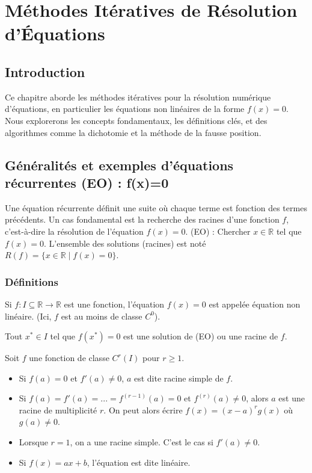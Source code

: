 \documentclass{article}
\begin{document}
\sloppy

\section{Méthodes Itératives de Résolution d'Équations} %
\subsection{Introduction} %
Ce chapitre aborde les méthodes itératives pour la résolution numérique d'équations, en particulier les équations non linéaires de la forme $f(x)=0$. Nous explorerons les concepts fondamentaux, les définitions clés, et des algorithmes comme la dichotomie et la méthode de la fausse position.

\subsection{Généralités et exemples d'équations récurrentes (EO) : f(x)=0} %
Une équation récurrente définit une suite où chaque terme est fonction des termes précédents. Un cas fondamental est la recherche des racines d'une fonction $f$, c'est-à-dire la résolution de l'équation $f(x)=0$.
(EO) : Chercher $x \in \mathbb{R}$ tel que $f(x)=0$.
L'ensemble des solutions (racines) est noté $R(f) = \{x \in \mathbb{R} \mid f(x)=0\}$.

\subsubsection{Définitions} %
\begin{definition}
Si $f: I \subseteq \mathbb{R} \to \mathbb{R}$ est une fonction, l'équation $f(x)=0$ est appelée équation non linéaire. (Ici, $f$ est au moins de classe $C^0$).
\end{definition}

\begin{definition}[Solution]
Tout $x^* \in I$ tel que $f(x^*)=0$ est une solution de (EO) ou une racine de $f$.
\end{definition}

\begin{definition}
Soit $f$ une fonction de classe $C^r(I)$ pour $r \ge 1$.
\begin{itemize}
    \item Si $f(a)=0$ et $f'(a) \ne 0$, $a$ est dite racine simple de $f$.
    \item Si $f(a)=f'(a)=...=f^{(r-1)}(a)=0$ et $f^{(r)}(a) \ne 0$, alors $a$ est une racine de multiplicité $r$. On peut alors écrire $f(x) = (x-a)^r g(x)$ où $g(a) \ne 0$.
    \item Lorsque $r=1$, on a une racine simple. C'est le cas si $f'(a) \ne 0$.
    \item Si $f(x)=ax+b$, l'équation est dite linéaire.
\end{itemize}
\end{definition}
\end{document}

